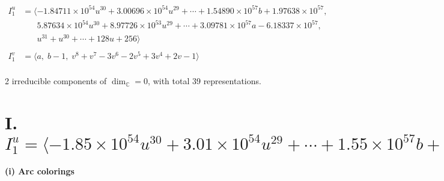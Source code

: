 \documentclass[1p]{elsarticle_modified}
\theoremstyle{definition}
\begin{document}
\begin{align*}
I^u_{1}&=\langle 
-1.84711\times10^{54} u^{30}+3.00696\times10^{54} u^{29}+\cdots+1.54890\times10^{57} b+1.97638\times10^{57},\\
\phantom{I^u_{1}}&\phantom{= \langle  }5.87634\times10^{54} u^{30}+8.97726\times10^{53} u^{29}+\cdots+3.09781\times10^{57} a-6.18337\times10^{57},\\
\phantom{I^u_{1}}&\phantom{= \langle  }u^{31}+u^{30}+\cdots+128 u+256\rangle \\
\\
I^v_{1}&=\langle 
a,\;b-1,\;v^8+v^7-3 v^6-2 v^5+3 v^4+2 v-1\rangle \\
\end{align*}
\raggedright * 2 irreducible components of $\dim_{\mathbb{C}}=0$, with total 39 representations.\\
\newpage
\renewcommand{\arraystretch}{1}
\centering \section*{I. $I^u_{1}= \langle -1.85\times10^{54} u^{30}+3.01\times10^{54} u^{29}+\cdots+1.55\times10^{57} b+1.98\times10^{57},\;5.88\times10^{54} u^{30}+8.98\times10^{53} u^{29}+\cdots+3.10\times10^{57} a-6.18\times10^{57},\;u^{31}+u^{30}+\cdots+128 u+256 \rangle$}
\flushleft \textbf{(i) Arc colorings}\\
\end{document}
